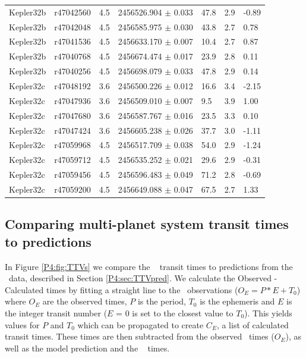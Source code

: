 {\begin{longtable}[h]{lllllll}
Kepler32b &  r47042560 &     4.5 & 2456526.904 $\pm$ 0.033 &      47.8 & 2.9 & -0.89 \\
Kepler32b &  r47042048 &     4.5 & 2456585.975 $\pm$ 0.030 &      43.8 & 2.7 &  0.78 \\
Kepler32b &  r47041536 &     4.5 & 2456633.170 $\pm$ 0.007 &      10.4 & 2.7 &  0.87 \\
Kepler32b &  r47040768 &     4.5 & 2456674.474 $\pm$ 0.017 &      23.9 & 2.8 &  0.11 \\
Kepler32b &  r47040256 &     4.5 & 2456698.079 $\pm$ 0.033 &      47.8 & 2.9 &  0.14 \\
Kepler32c &  r47048192 &     3.6 & 2456500.226 $\pm$ 0.012 &      16.6 & 3.4 & -2.15 \\
Kepler32c &  r47047936 &     3.6 & 2456509.010 $\pm$ 0.007 &       9.5 & 3.9 &  1.00 \\
Kepler32c &  r47047680 &     3.6 & 2456587.767 $\pm$ 0.016 &      23.5 & 3.3 &  0.10 \\
Kepler32c &  r47047424 &     3.6 & 2456605.238 $\pm$ 0.026 &      37.7 & 3.0 & -1.11 \\
Kepler32c &  r47059968 &     4.5 & 2456517.709 $\pm$ 0.038 &      54.0 & 2.9 & -1.24 \\
Kepler32c &  r47059712 &     4.5 & 2456535.252 $\pm$ 0.021 &      29.6 & 2.9 & -0.31 \\
Kepler32c &  r47059456 &     4.5 & 2456596.483 $\pm$ 0.049 &      71.2 & 2.8 & -0.69 \\
Kepler32c &  r47059200 &     4.5 & 2456649.088 $\pm$ 0.047 &      67.5 & 2.7 &  1.33 \\
\end{longtable}
}


\subsection{Comparing multi-planet system transit times to predictions}
\label{P4:sec:coolcompare}

In Figure \ref{P4:fig:TTVs} we compare the \spitzer~ transit times to predictions from the \Kepler~data, described in Section \ref{P4:sec:TTVpred}. We calculate the Observed - Calculated times by fitting a straight line to the \Kepler~observations ($O_E = P*E + T_0$) where $O_E$ are the observed times, $P$ is the period, $T_0$ is the ephemeris and $E$ is the integer transit number ($E$ = 0 is set to the closest value to $T_0$). This yields values for $P$ and $T_0$ which can be propagated to create $C_E$, a list of calculated transit times. These times are then subtracted from the observed \Kepler~times ($O_E$), as well as the model prediction and the \spitzer~ times.

